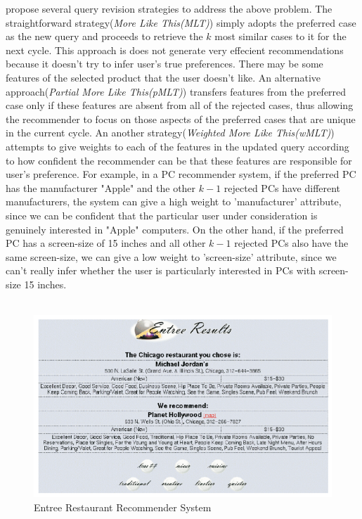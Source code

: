 \cite{comparisonbr} propose several query revision strategies to address the above problem.
The straightforward strategy(\textit{More Like This(MLT)}) simply adopts the preferred case as the new query and proceeds to retrieve the $k$ most similar cases to it for the next cycle.
This approach is does not generate very effecient recommendations because it doesn't try to infer user's true preferences.
There may be some features of the selected product that the user doesn't like.
An alternative approach(\textit{Partial More Like This(pMLT)}) transfers features from the preferred case only if these features are absent from all of the rejected cases, thus allowing the recommender to focus on those aspects of the preferred cases that are unique in the current cycle.
An another strategy(\textit{Weighted More Like This(wMLT)}) attempts to give weights to each of the features in the updated query according to how confident the recommender can be that these features are responsible for user's preference.
For example, in a PC recommender system, if the preferred PC has the manufacturer "Apple" and the other $k-1$ rejected PCs have different manufacturers, the system can give a high weight to 'manufacturer' attribute, since we can be confident that the particular user under consideration is genuinely interested in "Apple" computers.
On the other hand, if the preferred PC has a screen-size of 15 inches and all other $k-1$ rejected PCs also have the same screen-size, we can give a low weight to 'screen-size' attribute, since we can't really infer whether the user is particularly interested in PCs with screen-size 15 inches.\\
\\
\begin{figure}
    \includegraphics[width=1.0\textwidth]{figures-bharath/entree.png}
  \caption{Entree Restaurant Recommender System}
  \centering
\label{fig:entree}
\end{figure}
